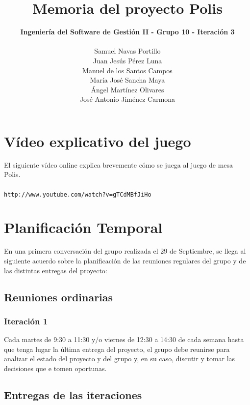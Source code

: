 \documentclass[11 pt]{book}
\begin{document}
\title{\textbf {\Huge Memoria del proyecto Polis}}
\author{
	\textbf {Ingeniería del Software de Gestión II - Grupo 10 - Iteración 3}\\\\
	Samuel Navas Portillo\\
	Juan Jesús Pérez Luna\\
	Manuel de los Santos Campos\\
	María José Sancha Maya\\
	Ángel Martínez Olivares\\
	José Antonio Jiménez Carmona}
\maketitle
\tableofcontents{}

\chapter{Vídeo explicativo del juego}
	El siguiente vídeo online explica brevemente cómo se juega al juego de mesa Polis.\\ \\
	\texttt{http://www.youtube.com/watch?v=gTCdMBfJiHo}
	
\chapter{Planificación Temporal}
	En una primera conversación del grupo realizada el 29 de Septiembre, se llega al siguiente acuerdo sobre la planificación de las reuniones regulares del grupo y de las distintas entregas del proyecto:\\

    \section{Reuniones ordinarias}
        \subsection*{Iteración 1}
	        Cada martes de 9:30 a 11:30 y/o viernes de 12:30 a 14:30 de cada semana hasta que tenga lugar la última entrega del proyecto, el grupo debe reunirse para analizar el estado del proyecto y del grupo y, en su caso, discutir y tomar las decisiones que e tomen oportunas.\\

    \section{Entregas de las iteraciones}
\end{document}
